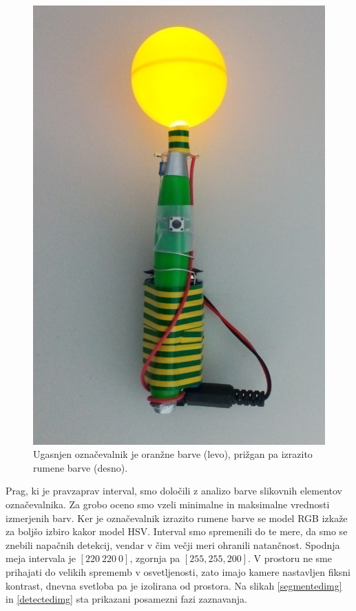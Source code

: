 \documentclass[a4paper, 12pt]{book}
\begin{document}
\begin{figure}[H]
\includegraphics[scale=0.6]{marker_on.png}
\caption{Ugasnjen označevalnik je oranžne barve (levo), prižgan pa izrazito rumene barve (desno).}
\label{markerimg}
\end{figure}

Prag, ki je pravzaprav interval, smo določili z analizo barve slikovnih elementov označevalnika. Za grobo oceno smo vzeli minimalne in maksimalne vrednosti izmerjenih barv. Ker je označevalnik izrazito rumene barve se model RGB izkaže za boljšo izbiro kakor model HSV. Interval smo spremenili do te mere, da smo se znebili napačnih detekcij, vendar v čim večji meri ohranili natančnost. Spodnja meja intervala je $[220 \ 220 \ 0]$, zgornja pa $[255, 255, 200]$. V prostoru ne sme prihajati do velikih sprememb v osvetljenosti, zato imajo kamere nastavljen fiksni kontrast, dnevna svetloba pa je izolirana od prostora. Na slikah \ref{segmentedimg} in \ref{detectedimg} sta prikazani posamezni fazi zaznavanja.
\end{document}
